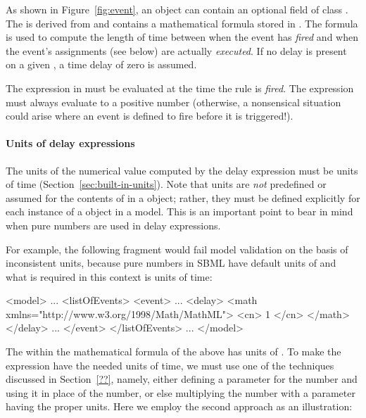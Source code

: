 \begin{blockChanged}
As shown in Figure~\ref{fig:event}, an \Event object can contain
an optional  field of class \Delay.  The \Delay is
derived from \SBase and contains a mathematical formula stored in
.  The formula is used to compute the length of time
between when the event has \emph{fired} and when the event's
assignments (see below) are actually \emph{executed}.  If no delay
is present on a given \Event, a time delay of zero is assumed.

The expression in  must be evaluated at the time the
rule is \emph{fired}.  The expression must always evaluate to a
positive number (otherwise, a nonsensical situation could arise
where an event is defined to fire before it is triggered!).  


\paragraph{Units of delay expressions}

The units of the numerical value computed by the delay expression
must be units of time (Section~\ref{sec:built-in-units}).  Note
that units are \emph{not} predefined or assumed for the contents
of  in a \Delay object; rather, they must be defined
explicitly for each instance of a \Delay object in a model.  This
is an important point to bear in mind when pure numbers are used
in delay expressions.

For example, the following \Event fragment would fail model
validation on the basis of inconsistent units, because pure
numbers in SBML have default units of  and what
is required in this context is units of time:

\begin{example}
<model>
    ...
    <listOfEvents>
        <event>
            ...
            <delay>
                <math xmlns="http://www.w3.org/1998/Math/MathML">
                    <cn> 1 </cn>
                </math>
            </delay>
            ...
        </event>
    </listOfEvents>
    ...
</model>
\end{example}

The  within the mathematical formula of the
 above has units of .  To make the
expression have the needed units of time, we must use one of the
techniques discussed in Section~\ref{??}, namely, either defining
a parameter for the number and using it in place of the number, or
else multiplying the number with a parameter having the proper
units.  Here we employ the second approach as an illustration:


\end{blockChanged}
